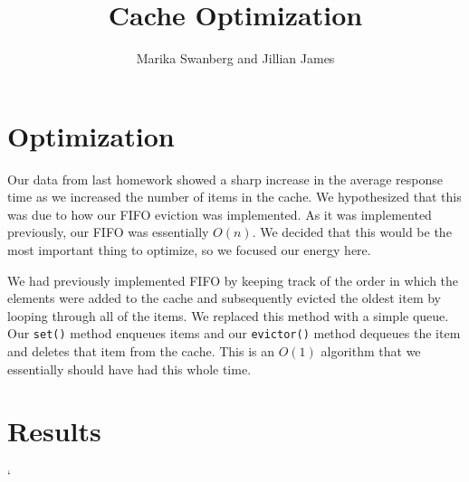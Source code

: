\documentclass[12pt]{article}
\author{Marika Swanberg and Jillian James}
\title{Cache Optimization}
\date{}
\begin{document}
\maketitle
\section{Optimization}
Our data from last homework showed a sharp increase in the average response time as we increased the number of items in the cache. We hypothesized that this was due to how our FIFO eviction was implemented. As it was implemented previously, our FIFO was essentially $O(n)$. We decided that this would be the most important thing to optimize, so we focused our energy here. 

We had previously implemented FIFO by keeping track of the order in which the elements were added to the cache and subsequently evicted the oldest item by looping through all of the items. We replaced this method with a simple queue. Our \texttt{set()} method enqueues items and our \texttt{evictor()} method dequeues the item and deletes that item from the cache. This is an $O(1)$ algorithm that we essentially should have had this whole time.

\section{Results}
\bigskip 

`
\end{document}
